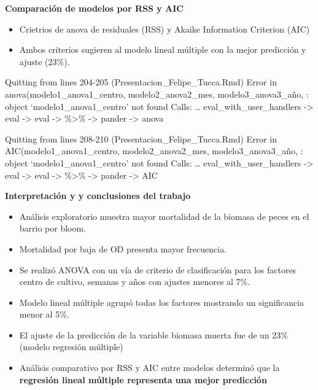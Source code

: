 \documentclass[
  ignorenonframetext,
]{beamer}
\begin{document}
\begin{frame}{\textbf{Comparación de modelos por RSS y AIC}}
\protect\hypertarget{comparaciuxf3n-de-modelos-por-rss-y-aic}{}
\begin{itemize}
\item
  Crietrios de anova de residuales (RSS) y Akaike Information Criterion
  (AIC)
\item
  Ambos criterios sugieren al modelo lineal múltiple con la mejor
  predicción y ajuste (23\%).
\end{itemize}

Quitting from lines 204-205 (Presentacion\_Felipe\_Tucca.Rmd) Error in
anova(modelo1\_anova1\_centro, modelo2\_anova2\_mes,
modelo3\_anova3\_año, : object `modelo1\_anova1\_centro' not found
Calls: \ldots{} eval\_with\_user\_handlers -\textgreater{} eval
-\textgreater{} eval -\textgreater{} \%\textgreater\% -\textgreater{}
pander -\textgreater{} anova

Quitting from lines 208-210 (Presentacion\_Felipe\_Tucca.Rmd) Error in
AIC(modelo1\_anova1\_centro, modelo2\_anova2\_mes, modelo3\_anova3\_año,
: object `modelo1\_anova1\_centro' not found Calls: \ldots{}
eval\_with\_user\_handlers -\textgreater{} eval -\textgreater{} eval
-\textgreater{} \%\textgreater\% -\textgreater{} pander -\textgreater{}
AIC
\end{frame}

\begin{frame}{\textbf{Interpretación y y conclusiones del trabajo}}
\protect\hypertarget{interpretaciuxf3n-y-y-conclusiones-del-trabajo}{}
\begin{itemize}
\item
  Análisis exploratorio muestra mayor mortalidad de la biomasa de peces
  en el barrio por bloom.
\item
  Mortalidad por baja de OD presenta mayor frecuencia.
\item
  Se realizó ANOVA con un vía de criterio de clasificación para los
  factores centro de cultivo, semanas y años con ajustes menores al 7\%.
\item
  Modelo lineal múltiple agrupó todas los factores mostrando un
  significancia menor al 5\%.
\item
  El ajuste de la predicción de la variable biomasa muerta fue de un
  23\% (modelo regresión múltiple)
\item
  Análisis comparativo por RSS y AIC entre modelos determinó que la
  \textbf{regresión lineal múltiple representa una mejor predicción}
\end{itemize}
\end{frame}
\end{document}

